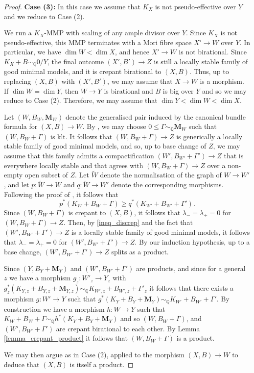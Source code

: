 \documentclass[12pt]{amsart}
\theoremstyle{plain}
\theoremstyle{definition}
\def\QQ{\mathbb Q}
\def\dim{\operatorname{dim}}
\def\rar{\rightarrow}
\begin{document}
\begin{proof}
{\bf Case (3):} In this case we assume that $K_X$ is not pseudo-effective over $Y$ 
and we reduce to Case (2).

We run a $K_X$-MMP with scaling of any ample divisor over $Y$.
Since $K_X$ is not pseudo-effective, this MMP terminates with a Mori fibre space 
$X' \rar W$ over $Y$.
In particular, we have $\dim W < \dim X$, and hence $X' \rar W$ is not birational.
Since $K_X+B \sim_{\QQ}0/Y$, the final outcome $(X',B') \rar Z$ is still a locally stable 
family of good minimal models, and it is crepant birational to $(X,B)$.
Thus, up to replacing $(X,B)$ with $(X',B')$, we may assume that $X \rar W$ is a morphism.
If $\dim W = \dim Y$, then $W \rar Y$ is birational and $B$ is big over $Y$ 
and so we may reduce to Case (2).
Therefore, we may assume that $\dim Y < \dim W < \dim X$.


Let $(W,B_W,\mathbf{M}_W)$ denote the generalised pair induced by the canonical bundle formula 
for $(X,B) \rar W$.
By \cite{Ambro05}, we may choose $0 \leq \Gamma \sim_\QQ \mathbf{M}_W$ such that $(W,B_W+\Gamma)$ is klt.
It follows that $(W,B_W+\Gamma) \rar Z$ is generically a locally stable family of good minimal models, and so, 
up to base change of $Z$, we may assume that this family admits a compactification 
$(W',B_{W'}+\Gamma') \rar Z$ that is everywhere locally stable and that agrees with 
$(W,B_W+\Gamma)\rar Z$ over a non-empty open subset of $Z$.
Let $\tilde W$ denote the normalisation of the graph of $W \rar W'$, and let 
$p \colon \tilde W \rar W$ and $q \colon \tilde W \rar W'$ denote the corresponding morphisms.
Following the proof of \cite[Theorem 11.40]{Kollar21}, it follows that
\begin{equation}\label{ineq_discrep}
p^*(K_W+B_W+\Gamma) \geq q^*(K_{W'}+B_{W'}+\Gamma').
\end{equation}
Since $(W,B_W+\Gamma)$ is crepant to $(X,B)$, it follows that $\lambda_-=\lambda_+=0$ for 
$(W,B_W+\Gamma) \rar Z$.
Then, by \eqref{ineq_discrep} and the fact that $(W',B_{W'}+\Gamma')\rar Z$ is a locally stable 
family of good minimal models, it follows that $\lambda_-=\lambda_+=0$ for $(W',B_{W'}+\Gamma')\rar Z$.
By our induction hypothesis, up to a base change, $(W',B_{W'}+\Gamma')\rar Z$ splits as a product.


Since $(Y,B_Y+\mathbf{M}_Y)$ and $(W',B_{W'}+\Gamma')$ are products, and 
since for a general $z$ we have a morphism
$g_z\colon W'_z \rightarrow Y_z$ with 
$g_z^*(K_{Y, z}+B_{Y, z}+\mathbf{M}_{Y, z}) \sim_{\mathbb Q} K_{W', z}+B_{W', z}+\Gamma'_z$
it follows that there exists a morphism $g\colon W' \rightarrow Y$ such that
$g^*(K_Y+B_Y+\mathbf{M}_Y) \sim_{\mathbb Q} K_{W'}+B_{W'}+\Gamma'$.
By construction we have a morphism $h\colon W \rightarrow Y$ such that 
$K_{W}+B_W+\Gamma \sim_{\mathbb Q} h^*(K_Y+B_Y+\mathbf{M}_Y)$
and so 
$(W,B_W+\Gamma)$, 
and $(W',B_{W'}+\Gamma')$ are crepant birational to each other.
By Lemma \ref{lemma_crepant_product} it follows that $(W, B_W+\Gamma)$ is a product.

We may then argue as in Case (2), applied to the morphism $(X, B) \rightarrow W$ 
to deduce that $(X, B)$ is itself a product.
\end{proof}












\end{document}

